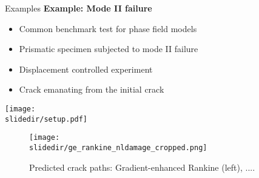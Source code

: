 
\begin{frame}{Examples}
    \textbf{Example: Mode II failure}
\begin{minipage}{1.0\textwidth}
\begin{minipage}{0.5\textwidth}
    \begin{itemize}
        \item Common benchmark test for phase field models
        \item Prismatic specimen subjected to mode II failure
        \item Displacement controlled experiment
        \item Crack emanating from the initial crack 
    \end{itemize}
\end{minipage}%
\hfill{}%
\begin{minipage}{0.4\textwidth}
    \centering
    \texttt{[image: \\slidedir/setup.pdf]}%
\end{minipage}
\end{minipage}
\vfill

\begin{minipage}{1.0\textwidth}
    \begin{figure}[htpb]
        \centering
    \texttt{[image: \\slidedir/ge\_rankine\_nldamage\_cropped.png]}%
        \caption{Predicted crack paths: Gradient-enhanced Rankine (left), ....}%
        \label{fig:name}
    \end{figure}
\end{minipage}
\end{frame}
